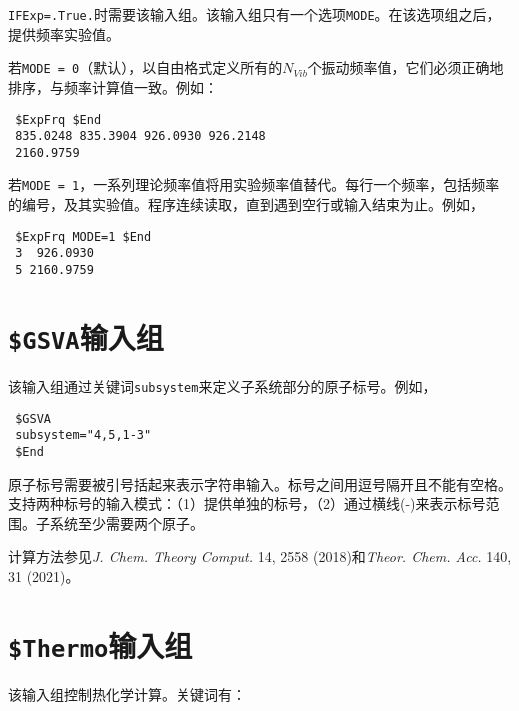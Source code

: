 \documentclass[12pt,a4paper,openany,twoside,cap,UTF8]{ctexbook}
\begin{document}
\verb|IFExp=.True.|时需要该输入组。该输入组只有一个选项\verb|MODE|。在该选项组之后，提供频率实验值。

\bigskip{}\noindent
若\verb|MODE = 0|（默认），以自由格式定义所有的$N_{Vib}$个振动频率值，它们必须正确地排序，与频率计算值一致。例如：
\begin{colorboxed}[oval=false,boxcolor=blue!75!black,bgcolor=blue!5!white]
\ttfamily
\begin{lstlisting}
 $ExpFrq $End
 835.0248 835.3904 926.0930 926.2148
 2160.9759
\end{lstlisting}\end{colorboxed}

\noindent
若\verb|MODE = 1|，一系列理论频率值将用实验频率值替代。每行一个频率，包括频率的编号，及其实验值。程序连续读取，直到遇到空行或输入结束为止。例如，
\begin{colorboxed}[oval=false,boxcolor=blue!75!black,bgcolor=blue!5!white]
\ttfamily
\begin{lstlisting}
 $ExpFrq MODE=1 $End
 3  926.0930
 5 2160.9759
\end{lstlisting}\end{colorboxed}


\section{\texttt{\$GSVA}输入组} \label{sec:inp-gsva}

该输入组通过关键词\verb|subsystem|来定义子系统部分的原子标号。例如，
\begin{colorboxed}[oval=false,boxcolor=blue!75!black,bgcolor=blue!5!white]
\ttfamily
\begin{lstlisting}
 $GSVA
 subsystem="4,5,1-3"
 $End
\end{lstlisting}\end{colorboxed}

原子标号需要被引号括起来表示字符串输入。标号之间用逗号隔开且不能有空格。支持两种标号的输入模式：（1）提供单独的标号，（2）通过横线(-)来表示标号范围。子系统至少需要两个原子。

计算方法参见\textit{J. Chem. Theory Comput.} 14, 2558 (2018)和\textit{Theor. Chem. Acc.} 140, 31 (2021)。

\section{\texttt{\$Thermo}输入组} \label{sec:inp-thermo}

该输入组控制热化学计算。关键词有：
\end{document}
